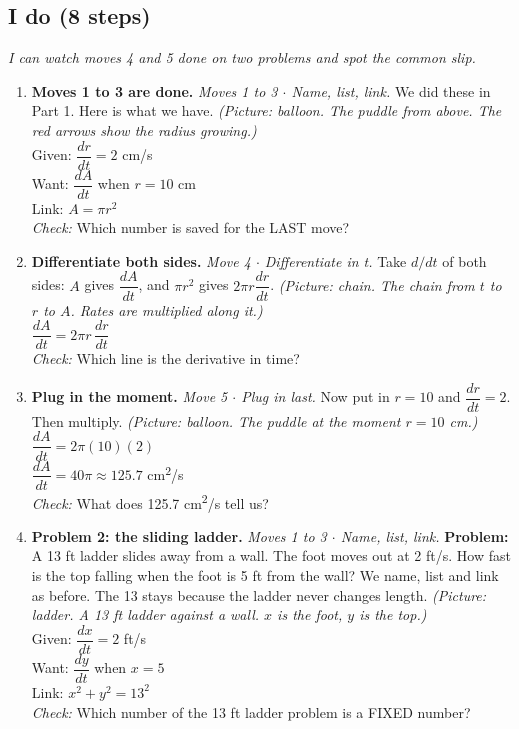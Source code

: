 \documentclass[11pt]{article}
\begin{document}
\subsection*{I do (8 steps)}
\textit{I can watch moves 4 and 5 done on two problems and spot the common slip.}\par
\begin{enumerate}
\item \textbf{Moves 1 to 3 are done.} \textit{Moves 1 to 3 $\cdot$ Name, list, link.} We did these in Part 1. Here is what we have. \textit{(Picture: balloon. The puddle from above. The red arrows show the radius growing.)}\\ Given: $\dfrac{dr}{dt}=2$ cm/s\\ Want: $\dfrac{dA}{dt}$ when $r=10$ cm\\ Link: $A=\pi r^2$\\ \textit{Check:} Which number is saved for the LAST move? 
\item \textbf{Differentiate both sides.} \textit{Move 4 $\cdot$ Differentiate in t.} Take $d/dt$ of both sides: $A$ gives $\dfrac{dA}{dt}$, and $\pi r^2$ gives $2\pi r\dfrac{dr}{dt}$. \textit{(Picture: chain. The chain from $t$ to $r$ to $A$. Rates are multiplied along it.)}\\ $\dfrac{dA}{dt}=2\pi r\,\dfrac{dr}{dt}$\\ \textit{Check:} Which line is the derivative in time? 
\item \textbf{Plug in the moment.} \textit{Move 5 $\cdot$ Plug in last.} Now put in $r=10$ and $\dfrac{dr}{dt}=2$. Then multiply. \textit{(Picture: balloon. The puddle at the moment $r=10$ cm.)}\\ $\dfrac{dA}{dt}=2\pi(10)(2)$\\ $\dfrac{dA}{dt}=40\pi\approx125.7$ cm\textsuperscript{2}/s\\ \textit{Check:} What does 125.7 cm\textsuperscript{2}/s tell us? 
\item \textbf{Problem 2: the sliding ladder.} \textit{Moves 1 to 3 $\cdot$ Name, list, link.} \textbf{Problem:} A 13 ft ladder slides away from a wall. The foot moves out at 2 ft/s. How fast is the top falling when the foot is 5 ft from the wall? We name, list and link as before. The 13 stays because the ladder never changes length. \textit{(Picture: ladder. A 13 ft ladder against a wall. $x$ is the foot, $y$ is the top.)}\\ Given: $\dfrac{dx}{dt}=2$ ft/s\\ Want: $\dfrac{dy}{dt}$ when $x=5$\\ Link: $x^2+y^2=13^2$\\ \textit{Check:} Which number of the 13 ft ladder problem is a FIXED number? 

\end{enumerate}
\end{document}
